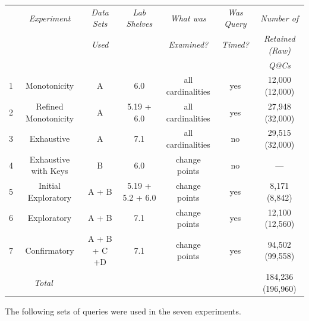 \documentclass[prodmode,acmtods]{acmsmall}
\begin{document}
\begin{table}[t]
{%
\resizebox{140mm}{!}
{
\begin{tabular}{c|c|c|c|c|c|c}
& {\em Experiment}& {\em Data Sets} & {\em Lab Shelves} & {\em What was} &{\em Was Query}&{\em Number of}\\
&                 & {\em Used}      &                   & {\em Examined?}&{\em Timed?}   &{\em Retained (Raw)}\\
&&&&&& {\em Q@Cs}\\
\hline
1 & Monotonicity 	& A & 6.0     &all cardinalities&yes& 12,000 (12,000)\\
2 & Refined Monotonicity& A & 5.19 + 6.0&all cardinalities&yes& 27,948 (32,000)\\
3 & Exhaustive 		& A & 7.1     &all cardinalities&no & 29,515 (32,000)\\
4 & Exhaustive with Keys & B& 6.0     &change points   &no& --- \\
5 & Initial Exploratory & A + B&5.19 + 5.2 + 6.0&change points&yes& 8,171 (8,842)\\
6 & Exploratory 	& A + B&7.1   &change points   &yes& 12,100 (12,560)\\
7 & Confirmatory 	&A + B + C +D&7.1&change points&yes& 94,502 (99,558)\\
\multicolumn{2}{c|}{\em Total}         &            & &               &   & 184,236 (196,960)\\
\end{tabular}
}
}
\end{table}

The following sets of queries were used in the seven experiments.
\end{document}
